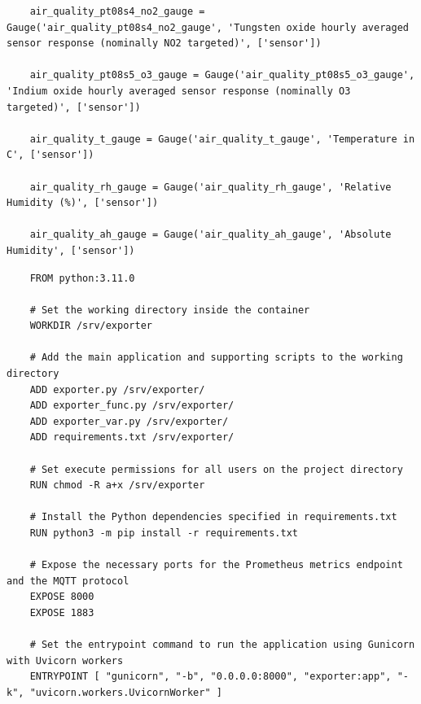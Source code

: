 \begin{verbatim}
    air_quality_pt08s4_no2_gauge = Gauge('air_quality_pt08s4_no2_gauge', 'Tungsten oxide hourly averaged sensor response (nominally NO2 targeted)', ['sensor'])

    air_quality_pt08s5_o3_gauge = Gauge('air_quality_pt08s5_o3_gauge', 'Indium oxide hourly averaged sensor response (nominally O3 targeted)', ['sensor'])

    air_quality_t_gauge = Gauge('air_quality_t_gauge', 'Temperature in C', ['sensor'])

    air_quality_rh_gauge = Gauge('air_quality_rh_gauge', 'Relative Humidity (%)', ['sensor'])

    air_quality_ah_gauge = Gauge('air_quality_ah_gauge', 'Absolute Humidity', ['sensor'])
\end{verbatim}

\begin{verbatim}
    FROM python:3.11.0

    # Set the working directory inside the container
    WORKDIR /srv/exporter

    # Add the main application and supporting scripts to the working directory
    ADD exporter.py /srv/exporter/
    ADD exporter_func.py /srv/exporter/
    ADD exporter_var.py /srv/exporter/
    ADD requirements.txt /srv/exporter/

    # Set execute permissions for all users on the project directory
    RUN chmod -R a+x /srv/exporter

    # Install the Python dependencies specified in requirements.txt
    RUN python3 -m pip install -r requirements.txt

    # Expose the necessary ports for the Prometheus metrics endpoint and the MQTT protocol
    EXPOSE 8000
    EXPOSE 1883

    # Set the entrypoint command to run the application using Gunicorn with Uvicorn workers
    ENTRYPOINT [ "gunicorn", "-b", "0.0.0.0:8000", "exporter:app", "-k", "uvicorn.workers.UvicornWorker" ]
\end{verbatim}

